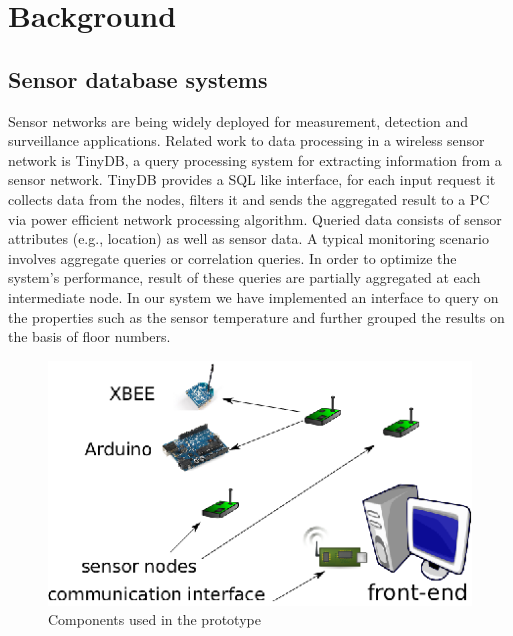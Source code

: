 \section{Background}\label{sec:background}

\subsection{Sensor database systems}
Sensor networks are being widely deployed for measurement, detection and surveillance applications.  Related work to data processing in a wireless sensor network is TinyDB, a query processing system for extracting information from a sensor network. TinyDB provides a SQL like interface, for each input request it collects data from the nodes, filters it and sends the aggregated result to a PC via power efficient network processing algorithm. Queried data consists of sensor attributes (e.g., location) as well as sensor data. A typical monitoring scenario involves aggregate queries or correlation queries. In order to optimize the system's  performance, result of these queries are partially aggregated at each intermediate node. In our system we have implemented an interface to query on the properties such as the sensor temperature and further grouped the results on the basis of floor numbers.

\begin{figure}[t]
\centering
\includegraphics[scale=1.2]{figures/topology.eps}
\caption{Components used in the prototype}
\label{fig:topology}
\end{figure}

